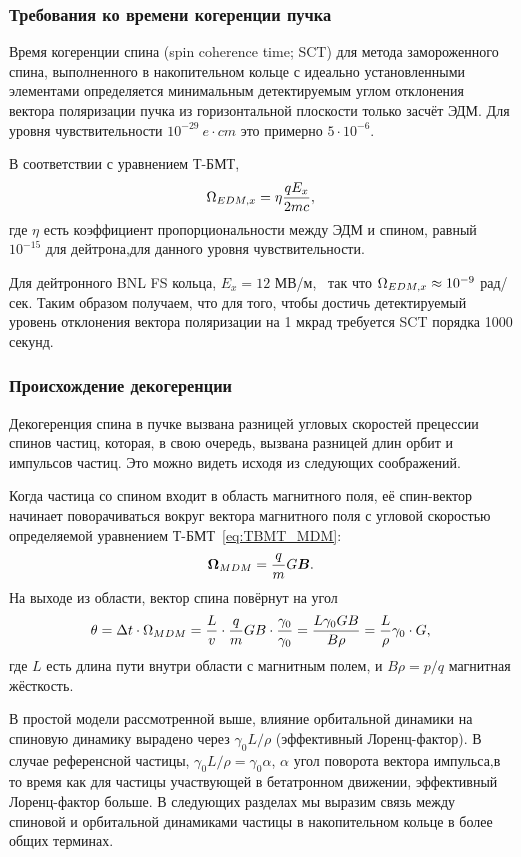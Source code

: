 \subsubsection{Требования ко времени когеренции пучка}
Время когеренции спина (spin coherence time; SCT) для метода
замороженного спина, выполненного в накопительном кольце с идеально
установленными элементами определяется минимальным детектируемым углом
отклонения вектора поляризации пучка из горизонтальной плоскости
только засчёт ЭДМ. Для уровня чувствительности $10^{-29}~e\cdot cm$
это примерно $5\cdot10^{-6}$.~\cite{BNL:Deuteron2008}

В соответствии с уравнением Т-БМТ,
\[
\Omega_{EDM,x} = \eta\frac{qE_x}{2mc},
\]
где $\eta$ есть коэффициент пропорциональности между ЭДМ и спином,
равный $10^{-15}$ для дейтрона,для данного уровня чувствительности.~\cite[стр.~206]{Eremey:Thesis}

Для дейтронного BNL FS кольца, $E_x = 12$
МВ/м,~\cite[стр.~19]{BNL:Deuteron2008} так что $\Omega_{EDM,x}\approx
10^{-9}$ рад/сек. Таким образом получаем, что для того, чтобы достичь
детектируемый уровень отклонения вектора поляризации на 1 мкрад требуется SCT порядка 1000 секунд.~\cite[стр.~207]{Eremey:Thesis}
\subsubsection{Происхождение декогеренции}
Декогеренция спина в пучке вызвана разницей угловых скоростей
прецессии спинов частиц, которая, в свою очередь, вызвана разницей
длин орбит и импульсов частиц. Это можно видеть исходя из следующих
соображений.

Когда частица со спином входит в область магнитного поля, её спин-вектор
начинает поворачиваться вокруг вектора магнитного поля с угловой
скоростью определяемой уравнением Т-БМТ~\eqref{eq:TBMT_MDM}:
\begin{equation*}
	\boldsymbol{\Omega}_{MDM} = \frac qm G\boldsymbol B.
\end{equation*}
На выходе из области, вектор спина повёрнут на угол
\begin{equation*}
	\theta = \Delta t\cdot\Omega_{MDM} = \frac Lv \cdot \frac qm GB\cdot \frac{\gamma_0}{\gamma_0} = \frac{L\gamma_0 GB}{B\rho} = \frac L\rho\gamma_0\cdot G,
\end{equation*}
где $L$ есть длина пути внутри области с магнитным полем, и $B\rho =
p/q$ магнитная жёсткость.

В простой модели рассмотренной выше, влияние орбитальной динамики на
спиновую динамику вырадено через $\gamma_0 L/\rho$ (эффективный
Лоренц-фактор). В случае референсной частицы, $\gamma_0L/\rho =
\gamma_0\alpha$, $\alpha$ угол поворота вектора импульса,в то время
как для частицы участвующей в бетатронном движении, эффективный
Лоренц-фактор больше. В следующих разделах мы выразим связь между
спиновой и орбитальной динамиками частицы в накопительном кольце в
более общих терминах.

